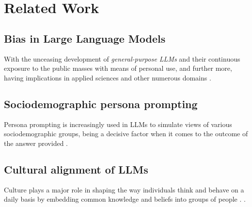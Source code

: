 \documentclass[11pt]{article}
\begin{document}


\section{Related Work}
\subsection{Bias in Large Language Models}
With the unceasing development of \textit{general-purpose LLMs} and their continuous exposure to the public masses with means of personal use, and further more, having implications in applied sciences and other numerous domains \cite{guo2024}.

\subsection{Sociodemographic persona prompting}
Persona prompting is increasingly used in LLMs to simulate views of various sociodemographic groups, being a decisive factor when it comes to the outcome of the answer provided \cite{lutz2025}.

\subsection{Cultural alignment of LLMs}
Culture plays a major role in shaping the way individuals think and behave on a daily basis \cite{oyserman2008} by embedding common knowledge and beliefs into groups of people \cite{hofstede2001}. \cite{tao2024}.
\end{document}
